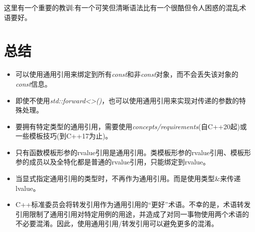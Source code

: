 这里有一个重要的教训:有一个可笑但清晰语法比有一个很酷但令人困惑的混乱术语要好。\par


\section{总结}

\begin{itemize}
  \item 可以使用通用引用来绑定到所有\textit{const}和非\textit{const}对象，而不会丢失该对象的\textit{const}信息。
  \item 即使不使用\textit{std::\allowbreak{}forward<\allowbreak{}>(\allowbreak{})\allowbreak{}}，也可以使用通用引用来实现对传递的参数的特殊处理。
  \item 要拥有特定类型的通用引用，需要使用\textit{concepts/\allowbreak{}requirements}(自C++20起)或一些模板技巧(到C++17为止)。
  \item 只有函数模板形参的rvalue引用是通用引用。类模板形参的rvalue引用、模板形参的成员以及全特化都是普通的rvalue引用，只能绑定到rvalue。
  \item 当显式指定通用引用的类型时，不再作为通用引用。而是使用类型\&来传递lvalue。
  \item C++标准委员会将转发引用作为通用引用的“更好”术语。不幸的是，术语转发引用限制了通用引用对特定用例的用途，并造成了对同一事物使用两个术语的不必要混淆。因此，使用通用引用/转发引用可以避免更多的混淆。
\end{itemize}
